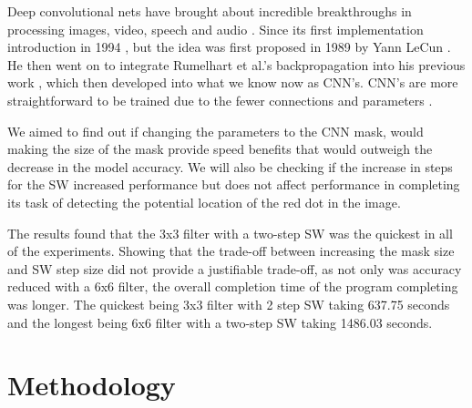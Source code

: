 \documentclass[a4paper,10pt]{article}
\begin{document}
Deep convolutional nets have brought about incredible breakthroughs in processing images, video, speech and audio \cite{lecun2015deep}. Since its first implementation introduction in 1994 \cite{lecun1998gradient}, but the idea was first proposed in 1989 by Yann LeCun \cite{lecun1989generalization}. He then went on to integrate Rumelhart et al.'s \cite{rumelhart1985learning} backpropagation into his previous work \cite{lecun1989backpropagation}, which then developed into what we know now as CNN's. CNN's are more straightforward to be trained due to the fewer connections and parameters \cite{krizhevsky2012imagenet}. 

We aimed to find out if changing the parameters to the CNN mask, would making the size of the mask provide speed benefits that would outweigh the decrease in the model accuracy. We will also be checking if the increase in steps for the SW increased performance but does not affect performance in completing its task of detecting the potential location of the red dot in the image.

The results found that the 3x3 filter with a two-step SW was the quickest in all of the experiments. Showing that the trade-off between increasing the mask size and SW step size did not provide a justifiable trade-off, as not only was accuracy reduced with a 6x6 filter, the overall completion time of the program completing was longer. The quickest being 3x3 filter with 2 step SW taking 637.75 seconds and the longest being 6x6 filter with a two-step SW taking 1486.03 seconds. 



\section{Methodology}
\end{document}
